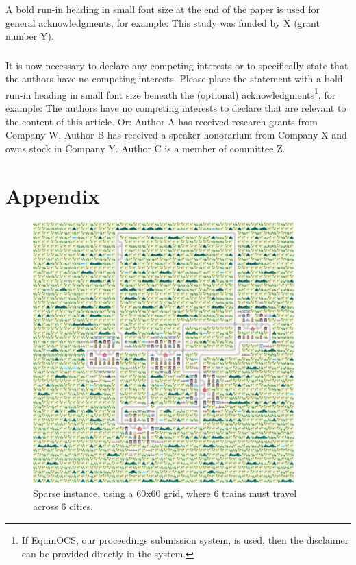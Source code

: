 \documentclass[runningheads]{llncs}
\begin{document}
\begin{credits}
\subsubsection{\ackname} A bold run-in heading in small font size at the end of the paper is
used for general acknowledgments, for example: This study was funded
by X (grant number Y).

\subsubsection{\discintname}
It is now necessary to declare any competing interests or to specifically
state that the authors have no competing interests. Please place the
statement with a bold run-in heading in small font size beneath the
(optional) acknowledgments\footnote{If EquinOCS, our proceedings submission
system, is used, then the disclaimer can be provided directly in the system.},
for example: The authors have no competing interests to declare that are
relevant to the content of this article. Or: Author A has received research
grants from Company W. Author B has received a speaker honorarium from
Company X and owns stock in Company Y. Author C is a member of committee Z.
\end{credits}









\appendix
\clearpage
\section{Appendix}
\label{sec:appendix}

\begin{figure}[h]
	
	\centering
	\includegraphics[width=0.9\textwidth]{sparse/sparse_0_1}
	\caption{Sparse instance, using a 60x60 grid, where 6 trains must travel across 6 cities.}
	\label{sparse_0_1_fullpage}
\end{figure}
\end{document}
